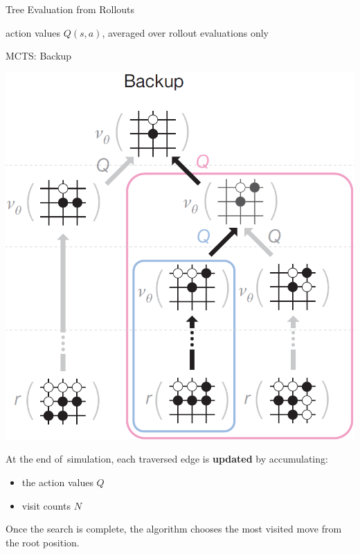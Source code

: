 \documentclass{beamer}
\begin{document}
{\begin{frame}{Tree Evaluation from Rollouts}
\begin{center}
        \tiny
        action values $Q(s, a)$, averaged over rollout evaluations only
      \end{center}
    \end{frame}

    \begin{frame}{MCTS: Backup}
      \begin{center}
        \includegraphics[height=.6\textheight]{../img/MCTS_backup.png}
      \end{center}
      
      \tiny
      At the end of~simulation, each traversed edge is \textbf{updated} by accumulating:
        \begin{itemize}[<+- | alert@+>]
          \item the action values $Q$
          \item visit counts $N$
        \end{itemize}
    \end{frame}

    \begin{frame}[standout]
      Once the search is complete, the algorithm chooses \alert{the most visited move} from the root position.
    \end{frame}

}
\end{document}
